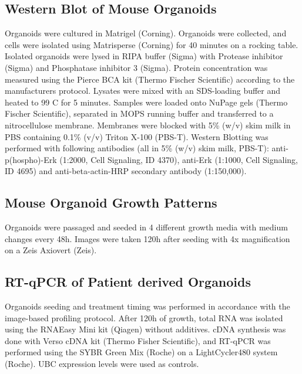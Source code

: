 \begin{flushleft}
\subsection{Western Blot of Mouse Organoids}
Organoids were cultured in Matrigel (Corning). Organoids were collected, and cells were isolated using Matrisperse (Corning) for 40 minutes on a rocking table. Isolated organoids were lysed in RIPA buffer (Sigma) with Protease inhibitor (Sigma) and Phosphatase inhibitor 3 (Sigma). Protein concentration was measured using the Pierce BCA kit (Thermo Fischer Scientific) according to the manufacturers protocol. Lysates were mixed with an SDS-loading buffer and heated to 99 C for 5 minutes. Samples were loaded onto NuPage gels (Thermo Fischer Scientific), separated in MOPS running buffer and transferred to a nitrocellulose membrane. Membranes were blocked with 5\% (w/v) skim milk in PBS containing 0.1\% (v/v) Triton X-100 (PBS-T). Western Blotting was performed with following antibodies (all in 5\% (w/v) skim milk, PBS-T): anti-p(hospho)-Erk (1:2000, Cell Signaling, ID 4370), anti-Erk (1:1000, Cell Signaling, ID 4695) and anti-beta-actin-HRP secondary antibody (1:150,000).

\subsection{Mouse Organoid Growth Patterns}
Organoids were passaged and seeded in 4 different growth media with medium changes every 48h. Images were taken 120h after seeding with 4x magnification on a Zeis Axiovert (Zeis). 

\subsection{RT-qPCR of Patient derived Organoids}
Organoids seeding and treatment timing was performed in accordance with the image-based profiling protocol. After 120h of growth, total RNA was isolated using the RNAEasy Mini kit (Qiagen) without additives. cDNA synthesis was done with Verso cDNA kit (Thermo Fisher Scientific), and RT-qPCR was performed using the SYBR Green Mix (Roche) on a LightCycler480 system (Roche). UBC expression levels were used as controls.


\end{flushleft}
